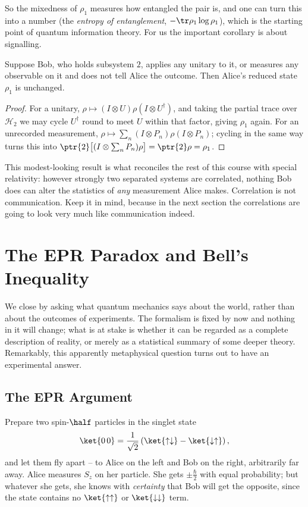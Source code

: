 So the mixedness of $\rho_1$ measures how entangled the pair is, and one can turn this into a number (the \emph{entropy of entanglement}, $-\tr\rho_1\log\rho_1$), which is the starting point of quantum information theory. For us the important corollary is about signalling.

\begin{proposition}[No Signalling]
    Suppose Bob, who holds subsystem $2$, applies any unitary to it, or measures any observable on it and does not tell Alice the outcome. Then Alice's reduced state $\rho_1$ is unchanged.
\end{proposition}
\begin{proof}
    For a unitary, $\rho \mapsto (I\otimes U)\rho(I\otimes U^\dagger)$, and taking the partial trace over $\mathcal{H}_2$ we may cycle $U^\dagger$ round to meet $U$ within that factor, giving $\rho_1$ again. For an unrecorded measurement, $\rho\mapsto\sum_n (I\otimes P_n)\rho(I\otimes P_n)$; cycling in the same way turns this into $\ptr{2}\big[(I\otimes \sum_n P_n)\rho\big] = \ptr{2}\rho = \rho_1$.
\end{proof}

This modest-looking result is what reconciles the rest of this course with special relativity: however strongly two separated systems are correlated, nothing Bob does can alter the statistics of \emph{any} measurement Alice makes. Correlation is not communication. Keep it in mind, because in the next section the correlations are going to look very much like communication indeed.

\section{The EPR Paradox and Bell's Inequality}\label{sec:epr}

We close by asking what quantum mechanics says about the world, rather than about the outcomes of experiments. The formalism is fixed by now and nothing in it will change; what is at stake is whether it can be regarded as a complete description of reality, or merely as a statistical summary of some deeper theory. Remarkably, this apparently metaphysical question turns out to have an experimental answer.

\subsection{The EPR Argument}

Prepare two spin-$\half$ particles in the singlet state
$$
\ket{0\,0} = \frac{1}{\sqrt2}\left( \ket{\uparrow\downarrow} - \ket{\downarrow\uparrow} \right),
$$
and let them fly apart -- to Alice on the left and Bob on the right, arbitrarily far away. Alice measures $S_z$ on her particle. She gets $\pm\frac\hbar2$ with equal probability; but whatever she gets, she knows with \emph{certainty} that Bob will get the opposite, since the state contains no $\ket{\uparrow\uparrow}$ or $\ket{\downarrow\downarrow}$ term.

